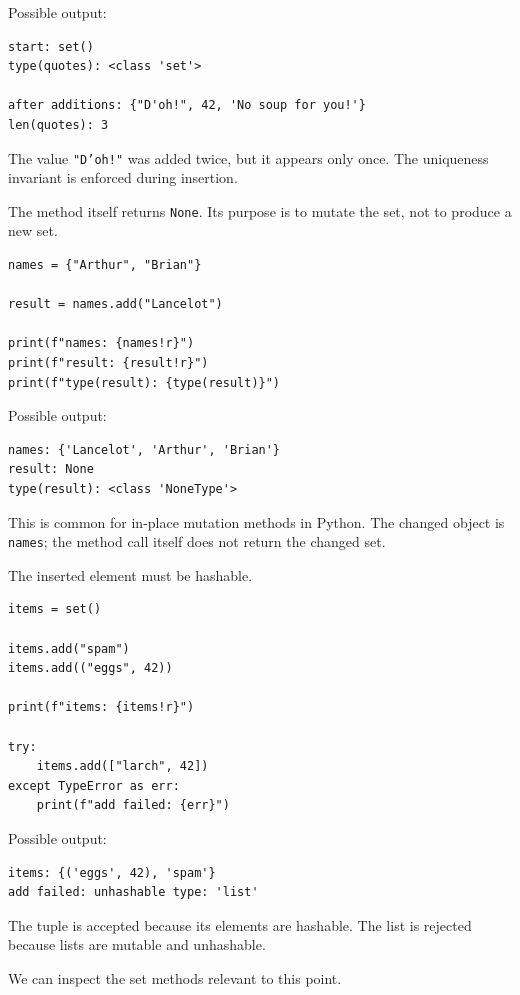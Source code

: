 Possible output:

\begin{verbatim}
start: set()
type(quotes): <class 'set'>

after additions: {"D'oh!", 42, 'No soup for you!'}
len(quotes): 3
\end{verbatim}

The value \texttt{"D'oh!"} was added twice, but it appears only once. The uniqueness invariant is enforced during insertion.

The method itself returns \texttt{None}. Its purpose is to mutate the set, not to produce a new set.

\begin{verbatim}
names = {"Arthur", "Brian"}

result = names.add("Lancelot")

print(f"names: {names!r}")
print(f"result: {result!r}")
print(f"type(result): {type(result)}")
\end{verbatim}

Possible output:

\begin{verbatim}
names: {'Lancelot', 'Arthur', 'Brian'}
result: None
type(result): <class 'NoneType'>
\end{verbatim}

This is common for in-place mutation methods in Python. The changed object is \texttt{names}; the method call itself does not return the changed set.

The inserted element must be hashable.

\begin{verbatim}
items = set()

items.add("spam")
items.add(("eggs", 42))

print(f"items: {items!r}")

try:
    items.add(["larch", 42])
except TypeError as err:
    print(f"add failed: {err}")
\end{verbatim}

Possible output:

\begin{verbatim}
items: {('eggs', 42), 'spam'}
add failed: unhashable type: 'list'
\end{verbatim}

The tuple is accepted because its elements are hashable. The list is rejected because lists are mutable and unhashable.

We can inspect the set methods relevant to this point.

